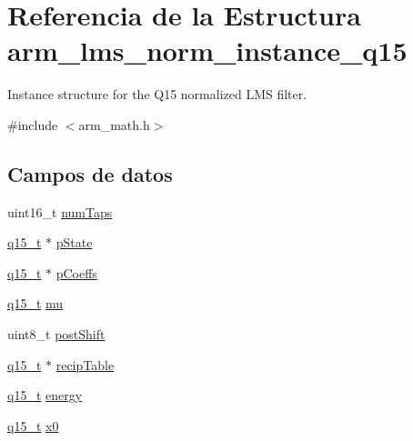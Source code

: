 \hypertarget{structarm__lms__norm__instance__q15}{}\section{Referencia de la Estructura arm\+\_\+lms\+\_\+norm\+\_\+instance\+\_\+q15}
\label{structarm__lms__norm__instance__q15}


Instance structure for the Q15 normalized L\+MS filter.  




{\ttfamily \#include $<$arm\+\_\+math.\+h$>$}

\subsection*{Campos de datos}
\begin{DoxyCompactItemize}
\item 
uint16\+\_\+t \hyperlink{structarm__lms__norm__instance__q15_a751941891e47f522a7f5375fe8990aac}{num\+Taps}
\item 
\hyperlink{arm__math_8h_ab5a8fb21a5b3b983d5f54f31614052ea}{q15\+\_\+t} $\ast$ \hyperlink{structarm__lms__norm__instance__q15_ae29dfdb736374fcddaeaec4b7770170c}{p\+State}
\item 
\hyperlink{arm__math_8h_ab5a8fb21a5b3b983d5f54f31614052ea}{q15\+\_\+t} $\ast$ \hyperlink{structarm__lms__norm__instance__q15_a7ca181a37f714d174445f486bebce26f}{p\+Coeffs}
\item 
\hyperlink{arm__math_8h_ab5a8fb21a5b3b983d5f54f31614052ea}{q15\+\_\+t} \hyperlink{structarm__lms__norm__instance__q15_aab4745770bd667de040227eec1b5ff8d}{mu}
\item 
uint8\+\_\+t \hyperlink{structarm__lms__norm__instance__q15_a74050e9f36542bd56f4052381a82ae8f}{post\+Shift}
\item 
\hyperlink{arm__math_8h_ab5a8fb21a5b3b983d5f54f31614052ea}{q15\+\_\+t} $\ast$ \hyperlink{structarm__lms__norm__instance__q15_a39b65b32f68643831304cece01e093bd}{recip\+Table}
\item 
\hyperlink{arm__math_8h_ab5a8fb21a5b3b983d5f54f31614052ea}{q15\+\_\+t} \hyperlink{structarm__lms__norm__instance__q15_ae7a8ccabc82348f6742ca7a2b3da2a41}{energy}
\item 
\hyperlink{arm__math_8h_ab5a8fb21a5b3b983d5f54f31614052ea}{q15\+\_\+t} \hyperlink{structarm__lms__norm__instance__q15_a3c975fed200b19723a2ed11efccca6cd}{x0}
\end{DoxyCompactItemize}


